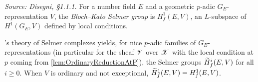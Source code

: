 \begin{definition}
  \label{def:SelmerGroup}
  \textit{Source: Disegni, §1.1.1.}
  For a number field $E$ and a geometric $p$-adic $G_E$-representation
  $V$, the \emph{Bloch--Kato Selmer group} is $H^1_f(E,V)$, an
  $L$-subspace of $H^1(G_E, V)$ defined by local conditions.

  \nek's theory of Selmer complexes yields, for nice $p$-adic families
  of $G_E$-representations (in particular for the sheaf $\mathscr{V}$ over
  $\mathscr{X}$ with the local condition at $p$ coming from
  \cref{lem:OrdinaryReductionAtP}), the Selmer groups
  $\widetilde{H}^i_f(E, V)$ for all $i \geq 0$.  When $V$ is ordinary and not
  exceptional, $\widetilde{H}^1_f(E, V) = H^1_f(E, V)$.
\end{definition}

